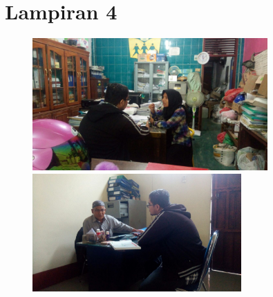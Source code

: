 \chapter*{Lampiran 4}
\begin{figure}[H]
	\includegraphics [width = 9cm]{gambar/wawancara/wawancara1}
	\includegraphics [width = 8cm]{gambar/wawancara/wawancara3}
\end{figure}

